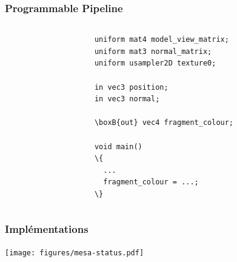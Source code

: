 \begin{frame}[fragile]
  \frametitle{Programmable Pipeline}
  \begin{columns}
    \begin{column}{.5\textwidth}
      
    \end{column}
    \begin{column}{.5\textwidth}
{\small
\begin{Verbatim}[commandchars=\\\{\}]
uniform mat4 model_view_matrix;
uniform mat3 normal_matrix;
uniform usampler2D texture0;

in vec3 position;
in vec3 normal;

\boxB{out} vec4 fragment_colour;

void main()
\{
  ...
  fragment_colour = ...;
\}
\end{Verbatim}
}
    \end{column}
  \end{columns}
\end{frame}

\begin{frame}
  \frametitle{Implémentations}
  \begin{center}
    \texttt{[image: figures/mesa-status.pdf]} %
  \end{center}
\end{frame}


